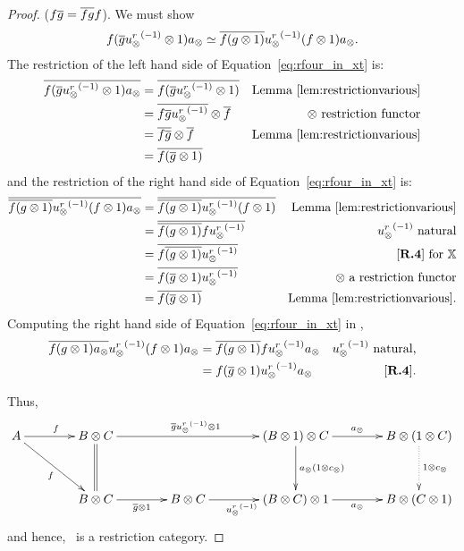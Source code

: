 \begin{proof}
      \rfour ($f \overline{g} = \overline{f g} f$). We must show
      \begin{equation}
        f (\overline{g} {u_{\otimes}^r}^{(-1)}\otimes 1) a_{\otimes} \overset{\scriptscriptstyle }{\simeq}
        \overline{f (g \otimes 1)} {u_{\otimes}^r}^{(-1)} (f\otimes 1) a_{\otimes}.
        \label{eq:rfour_in_xt}
      \end{equation}
      The restriction of the left hand side of Equation~\ref{eq:rfour_in_xt} is:
      \begin{align*}
        \overline{f (\overline{g} {u_{\otimes}^r}^{(-1)}\otimes 1) a_{\otimes}}
          & = \overline{f (\overline{g} {u_{\otimes}^r}^{(-1)}\otimes 1)} & \text{Lemma \ref{lem:restrictionvarious}} \\
        & = \overline{f \overline{g} {u_{\otimes}^r}^{(-1)}} \otimes \overline{f} & \otimes \text{ restriction functor}\\
        & = \overline{f \overline{g}} \otimes \overline{f} & \text{Lemma \ref{lem:restrictionvarious}} \\
        & = \overline{f (\overline{g} \otimes 1)}
      \end{align*}
      and the restriction of the right hand side of Equation~\ref{eq:rfour_in_xt}  is:
      \begin{align*}
        \rst{\rst{f (g \* 1)} \inv{\usr} (f\* 1) a_{\*}}
          & = \rst{\rst{f (g \* 1)} \inv{\usr} (f\* 1) } &  \text{Lemma \ref{lem:restrictionvarious}}\\
        & = \rst{\rst{f (g \* 1)} f \inv{\usr}  } & \inv{\usr} \text{ natural}\\
        & = \rst{f \rst{(g \* 1)}  \inv{\usr}  } & \text{ \rfour for }\X\\
        & = \rst{f (\rst{g} \* 1)  \inv{\usr}  } & \* \text{ a restriction functor}\\
        & = \rst{f (\rst{g} \* 1)    } & \text{Lemma \ref{lem:restrictionvarious}.}
      \end{align*}
      Computing the right hand side of Equation~\ref{eq:rfour_in_xt} in \X,
      \begin{align*}
        \overline{f(g\otimes 1)a_{\otimes}} {u_{\otimes}^r}^{(-1)} (f\otimes 1) a_{\otimes}
          & = \overline{f(g\otimes 1)} f {u_{\otimes}^r}^{(-1)} a_{\otimes} & {u_{\otimes}^r}^{(-1)}\text{ natural,}\\
        & = f (\overline{g} \otimes 1) {u_{\otimes}^r}^{(-1)} a_{\otimes} & [\text{\bfseries {R}.{4}}].
      \end{align*}

      Thus,
      \[
        \xymatrix @C=40pt @R=35pt{
          A \ar[r]^f \ar[dr]_{f}
            & B\* C \ar[rr]^{\restr{g} \inv{\usr}\* 1} \ar@{=}[d]
            &
            & (B\* 1) \* C \ar[r]^{a_{\*}} \ar[d]^{a_{\*}(1\*c_{\*})}
            & B \* (1 \* C)\ar@{.>}[d]^{1\*c_{\*}}\\
          & B\*C \ar[r]_{\rst{g}\*1}
            & B \* C \ar[r]_{\inv{\usr}}
            & (B \* C) \* 1 \ar[r]_{a_{\*}}
            & B \* (C\*1)
        }
      \]
  and hence, \Xt\ is a restriction category.
\end{proof}
